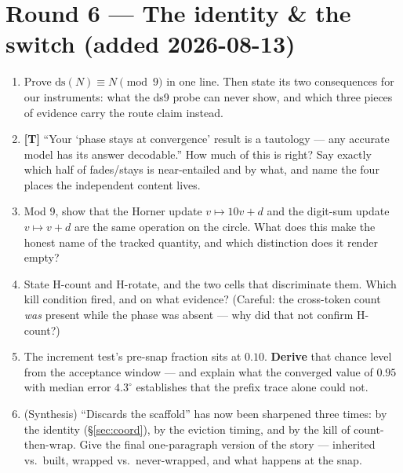 \documentclass[11pt]{article}
\newcommand{\ds}{\mathrm{ds}}
\newcommand{\trap}{\textcolor{trapcol}{\textbf{[T]}}}
\begin{document}
\section*{Round 6 --- The identity \& the switch (added 2026-08-13)}
\begin{enumerate}[leftmargin=*,itemsep=4pt,start=27]
\item Prove $\ds(N) \equiv N \pmod 9$ in one line. Then state its two
consequences for our instruments: what the ds9 probe can never show, and which
three pieces of evidence carry the route claim instead.
\item \trap{} ``Your `phase stays at convergence' result is a tautology --- any
accurate model has its answer decodable.'' How much of this is right? Say
exactly which half of fades/stays is near-entailed and by what, and name the four
places the independent content lives.
\item Mod 9, show that the Horner update $v \mapsto 10v + d$ and the digit-sum
update $v \mapsto v + d$ are the same operation on the circle. What does this
make the honest name of the tracked quantity, and which distinction does it
render empty?
\item State H-count and H-rotate, and the two cells that discriminate them.
Which kill condition fired, and on what evidence? (Careful: the cross-token
count \emph{was} present while the phase was absent --- why did that not confirm
H-count?)
\item The increment test's pre-snap fraction sits at $0.10$. \textbf{Derive}
that chance level from the acceptance window --- and explain what the converged
value of $0.95$ with median error $4.3^\circ$ establishes that the prefix trace
alone could not.
\item (Synthesis) ``Discards the scaffold'' has now been sharpened three times:
by the identity (\S\ref{sec:coord}), by the eviction timing, and by the kill of
count-then-wrap. Give the final one-paragraph version of the story --- inherited
vs.\ built, wrapped vs.\ never-wrapped, and what happens at the snap.
\end{enumerate}
\end{document}
